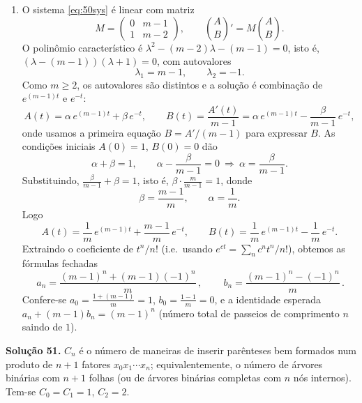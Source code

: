 \begin{enumerate}[label=(\alph*)]
\item O sistema \eqref{eq:50sys} é linear com matriz
\[
M=\begin{pmatrix}0 & m-1\\[2pt] 1 & m-2\end{pmatrix},\qquad
\binom{A}{B}'=M\binom{A}{B}.
\]
O polinômio característico é $\lambda^2-(m-2)\lambda-(m-1)=0$, isto é, $(\lambda-(m-1))(\lambda+1)=0$, com autovalores
\[
\lambda_1=m-1,\qquad \lambda_2=-1.
\]
Como $m\ge2$, os autovalores são distintos e a solução é combinação de $e^{(m-1)t}$ e $e^{-t}$:
\[
A(t)=\alpha\,e^{(m-1)t}+\beta\,e^{-t},\qquad B(t)=\frac{A'(t)}{m-1}=\alpha\,e^{(m-1)t}-\frac{\beta}{m-1}\,e^{-t},
\]
onde usamos a primeira equação $B=A'/(m-1)$ para expressar $B$. As condições iniciais $A(0)=1$, $B(0)=0$ dão
\[
\alpha+\beta=1,\qquad \alpha-\frac{\beta}{m-1}=0\ \Longrightarrow\ \alpha=\frac{\beta}{m-1}.
\]
Substituindo, $\frac{\beta}{m-1}+\beta=1$, isto é, $\beta\cdot\frac{m}{m-1}=1$, donde
\[
\beta=\frac{m-1}{m},\qquad \alpha=\frac1m.
\]
Logo
\[
A(t)=\frac1m\,e^{(m-1)t}+\frac{m-1}{m}\,e^{-t},\qquad
B(t)=\frac1m\,e^{(m-1)t}-\frac1m\,e^{-t}.
\]
Extraindo o coeficiente de $t^n/n!$ (i.e.\ usando $e^{ct}=\sum_n c^n t^n/n!$), obtemos as fórmulas fechadas
\[
\boxed{\,a_n=\frac{(m-1)^n+(m-1)(-1)^n}{m}\,},\qquad
\boxed{\,b_n=\frac{(m-1)^n-(-1)^n}{m}\,}.
\]
Confere-se $a_0=\frac{1+(m-1)}{m}=1$, $b_0=\frac{1-1}{m}=0$, e a identidade esperada $a_n+(m-1)b_n=(m-1)^n$ (número total de passeios de comprimento $n$ saindo de $1$).

\end{enumerate}


\bigskip\noindent\textbf{Solução 51.}\quad
$C_n$ é o número de maneiras de inserir parênteses bem formados num produto de $n+1$ fatores $x_0x_1\cdots x_n$; equivalentemente, o número de árvores binárias com $n+1$ folhas (ou de árvores binárias completas com $n$ nós internos). Tem-se $C_0=C_1=1$, $C_2=2$.

